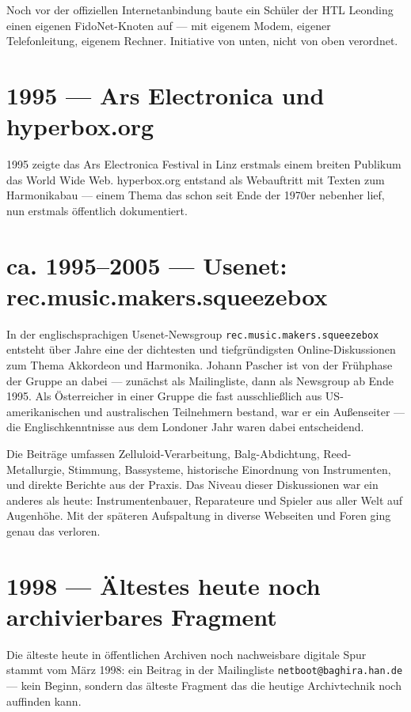 \documentclass[11pt]{report}
\begin{document}
Noch vor der offiziellen Internetanbindung baute ein Schüler der HTL Leonding einen eigenen FidoNet-Knoten auf --- mit eigenem Modem, eigener Telefonleitung, eigenem Rechner. Initiative von unten, nicht von oben verordnet.

\section{1995 --- Ars Electronica und hyperbox.org}

1995 zeigte das Ars Electronica Festival in Linz erstmals einem breiten Publikum das World Wide Web. hyperbox.org entstand als Webauftritt mit Texten zum Harmonikabau --- einem Thema das schon seit Ende der 1970er nebenher lief, nun erstmals öffentlich dokumentiert.

\section{ca. 1995--2005 --- Usenet: rec.music.makers.squeezebox}

In der englischsprachigen Usenet-Newsgroup \texttt{rec.music.makers.squeezebox} entsteht über Jahre eine der dichtesten und tiefgründigsten Online-Diskussionen zum Thema Akkordeon und Harmonika. Johann Pascher ist von der Frühphase der Gruppe an dabei --- zunächst als Mailingliste, dann als Newsgroup ab Ende 1995. Als Österreicher in einer Gruppe die fast ausschließlich aus US-amerikanischen und australischen Teilnehmern bestand, war er ein Außenseiter --- die Englischkenntnisse aus dem Londoner Jahr waren dabei entscheidend.

Die Beiträge umfassen Zelluloid-Verarbeitung, Balg-Abdichtung, Reed-Metallurgie, Stimmung, Bassysteme, historische Einordnung von Instrumenten, und direkte Berichte aus der Praxis. Das Niveau dieser Diskussionen war ein anderes als heute: Instrumentenbauer, Reparateure und Spieler aus aller Welt auf Augenhöhe. Mit der späteren Aufspaltung in diverse Webseiten und Foren ging genau das verloren.

\section{1998 --- Ältestes heute noch archivierbares Fragment}

Die älteste heute in öffentlichen Archiven noch nachweisbare digitale Spur stammt vom März 1998: ein Beitrag in der Mailingliste \texttt{netboot@baghira.han.de} --- kein Beginn, sondern das älteste Fragment das die heutige Archivtechnik noch auffinden kann.
\end{document}
